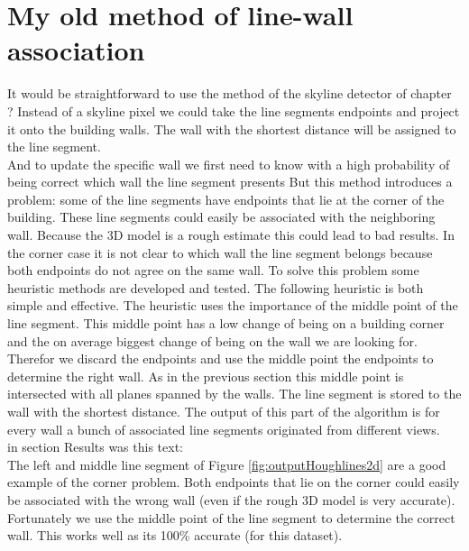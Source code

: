 \section{My old method of line-wall association}
\label{sec:oldmethodlwa}
It would be straightforward to use the method of the skyline detector of
chapter ?%
Instead of a skyline pixel we could take the line segments
endpoints and project it onto the building walls. The wall with the shortest
distance will be assigned to the line segment.\\

And to update the specific wall we first need to know with a high probability of being correct which wall the line segment presents
But this method introduces a problem: some of the line segments have endpoints that lie at the corner of the building. These line segments could easily be associated with the neighboring wall. Because the 3D model is a rough estimate this could lead to bad results.
In the corner case it is not clear to which wall the line segment belongs because both endpoints do not agree on the same wall. To solve this problem some heuristic methods are developed and tested. The following heuristic is both simple and effective.
The heuristic uses the importance of the middle point of the line segment. This middle point has a low change of being on a building corner and the on average biggest change of being on the wall we are looking for.
Therefor we discard the endpoints and use the middle point the endpoints to determine the right wall.
As in the previous section %
this middle point is intersected with all planes spanned by the walls. The line segment is stored to the wall with the shortest distance.
The output of this part of the algorithm is for every wall a bunch of associated line segments originated from different views.\\

in section Results was this text:\\
The left and middle line segment of Figure \ref{fig:outputHoughlines2d} 
are
a good example of the corner problem. Both endpoints that lie on the corner could easily be associated
with the wrong wall (even if the rough 3D model is very accurate). Fortunately
we use the middle point of the line segment to determine the correct wall. This
works well as its 100\% accurate (for this dataset).

